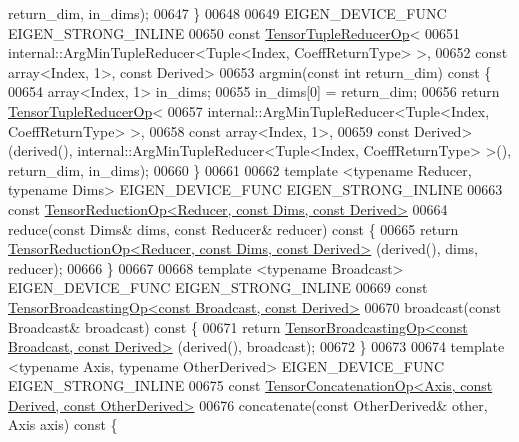 \begin{DoxyCode}
      return\_dim, in\_dims);
00647     \}
00648 
00649     EIGEN\_DEVICE\_FUNC EIGEN\_STRONG\_INLINE
00650     \textcolor{keyword}{const} \hyperlink{class_eigen_1_1_tensor_tuple_reducer_op}{TensorTupleReducerOp}<
00651       internal::ArgMinTupleReducer<Tuple<Index, CoeffReturnType> >,
00652       \textcolor{keyword}{const} array<Index, 1>, \textcolor{keyword}{const} Derived>
00653     argmin(\textcolor{keyword}{const} \textcolor{keywordtype}{int} return\_dim)\textcolor{keyword}{ const }\{
00654       array<Index, 1> in\_dims;
00655       in\_dims[0] = return\_dim;
00656       \textcolor{keywordflow}{return} \hyperlink{class_eigen_1_1_tensor_tuple_reducer_op}{TensorTupleReducerOp}<
00657         internal::ArgMinTupleReducer<Tuple<Index, CoeffReturnType> >,
00658         \textcolor{keyword}{const} array<Index, 1>,
00659         \textcolor{keyword}{const} Derived>(derived(), internal::ArgMinTupleReducer<Tuple<Index, CoeffReturnType> >(), 
      return\_dim, in\_dims);
00660     \}
00661 
00662     \textcolor{keyword}{template} <\textcolor{keyword}{typename} Reducer, \textcolor{keyword}{typename} Dims> EIGEN\_DEVICE\_FUNC EIGEN\_STRONG\_INLINE
00663     \textcolor{keyword}{const} \hyperlink{class_eigen_1_1_tensor_reduction_op}{TensorReductionOp<Reducer, const Dims, const Derived>}
00664     reduce(\textcolor{keyword}{const} Dims& dims, \textcolor{keyword}{const} Reducer& reducer)\textcolor{keyword}{ const }\{
00665       \textcolor{keywordflow}{return} \hyperlink{class_eigen_1_1_tensor_reduction_op}{TensorReductionOp<Reducer, const Dims, const Derived>}
      (derived(), dims, reducer);
00666     \}
00667 
00668     \textcolor{keyword}{template} <\textcolor{keyword}{typename} Broadcast> EIGEN\_DEVICE\_FUNC EIGEN\_STRONG\_INLINE
00669     \textcolor{keyword}{const} \hyperlink{class_eigen_1_1_tensor_broadcasting_op}{TensorBroadcastingOp<const Broadcast, const Derived>}
00670     broadcast(\textcolor{keyword}{const} Broadcast& broadcast)\textcolor{keyword}{ const }\{
00671       \textcolor{keywordflow}{return} \hyperlink{class_eigen_1_1_tensor_broadcasting_op}{TensorBroadcastingOp<const Broadcast, const Derived>}
      (derived(), broadcast);
00672     \}
00673 
00674     \textcolor{keyword}{template} <\textcolor{keyword}{typename} Axis, \textcolor{keyword}{typename} OtherDerived> EIGEN\_DEVICE\_FUNC EIGEN\_STRONG\_INLINE
00675     \textcolor{keyword}{const} \hyperlink{class_eigen_1_1_tensor_concatenation_op}{TensorConcatenationOp<Axis, const Derived, const OtherDerived>}
00676     concatenate(\textcolor{keyword}{const} OtherDerived& other, Axis axis)\textcolor{keyword}{ const }\{

\end{DoxyCode}
